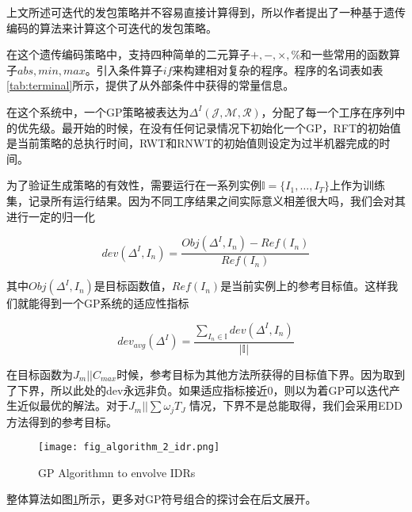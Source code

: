 上文所述可迭代的发包策略并不容易直接计算得到，所以作者提出了一种基于遗传编码的算法来计算这个可迭代的发包策略。

在这个遗传编码策略中，支持四种简单的二元算子$+,-,\times,\%$和一些常用的函数算子$abs,min,max$。引入条件算子$if$来构建相对复杂的程序。程序的名词表如表\ref{tab:terminal}所示，提供了从外部条件中获得的常量信息。



在这个系统中，一个GP策略被表达为$\Delta^I(\mathcal{J,M,R})$，分配了每一个工序在序列中的优先级。最开始的时候，在没有任何记录情况下初始化一个GP，RFT的初始值是当前策略的总执行时间，RWT和RNWT的初始值则设定为过半机器完成的时间。

为了验证生成策略的有效性，需要运行在一系列实例$\mathbb{I}=\{I_1,\dots,I_T\}$上作为训练集，记录所有运行结果。因为不同工序结果之间实际意义相差很大吗，我们会对其进行一定的归一化

$$dev(\Delta^I,I_n)=\frac{Obj(\Delta^I,I_n)-Ref(I_n)}{Ref(I_n)}$$

其中$Obj(\Delta^I,I_n)$是目标函数值，$Ref(I_n)$是当前实例上的参考目标值。这样我们就能得到一个GP系统的适应性指标

$$dev_{avg}(\Delta^I)=\frac{\sum\limits_{I_n\in \mathbb{I}}\limits^{} dev(\Delta^I, I_n)}{|\mathbb{I}|}$$

在目标函数为$J_m||C_{max}$时候，参考目标为其他方法所获得的目标值下界。因为取到了下界，所以此处的dev永远非负。如果适应指标接近0，则以为着GP可以迭代产生近似最优的解法。对于$J_m||\sum \omega_jT_J$ 情况，下界不是总能取得，我们会采用EDD方法得到的参考目标。

\begin{figure}[H]
    \texttt{[image: fig\_algorithm\_2\_idr.png]}
    \caption{GP Algorithmn to envolve IDRs}
    \label{fig:algorithm_gp_idr}
\end{figure}

整体算法如图\ref{fig:algorithm_gp_idr}所示，更多对GP符号组合的探讨会在后文展开。